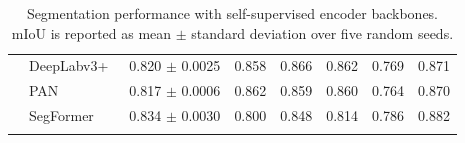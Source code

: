 \begin{table}
\begin{tabular}{llrrrrrr}
		                         & DeepLabv3+~\cite{DBLP:journals/corr/abs-1802-02611}       & 0.820 $\pm$ 0.0025                                 & 0.858                                  & 0.866                               & 0.862                                 & 0.769                               & 0.871                               \\
		                         & PAN~\cite{DBLP:journals/corr/abs-1805-10180}              & 0.817 $\pm$ 0.0006                                 & 0.862                                  & 0.859                               & 0.860                                 & 0.764                               & 0.870                               \\
		                         & SegFormer~\cite{xie2021segformer}                         & 0.834 $\pm$ 0.0030                                 & 0.800                                  & 0.848                               & 0.814                                 & 0.786                               & 0.882                               \\
		\bottomrule{}
	\end{tabular}
	\caption{Segmentation performance with self-supervised encoder backbones. mIoU is reported as mean $\pm$ standard deviation over five random seeds.}
	\label{tab:ssl-enc-seg}
\end{table}
